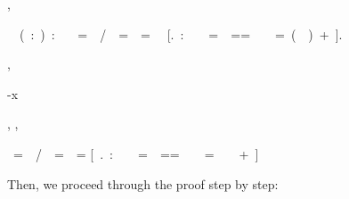 \documentclass[a4paper]{article}
\begin{document}
\begin{alectryon}
  \sep
  \begin{sentence}
    \begin{input}
      ~~(~:~)~:\nl
      ~~~=~~\PYZbs{}/~~=~~=\PYZgt{}\nl
      ~~[.~:~~\PYZpc{}\PYZpc{}~~=~~==\PYZgt{}~~\PYZpc{}\PYZpc{}~~=~(~\PYZpc{}\PYZpc{}~)~+~].
    \end{input}
    \sep
    \begin{output}
      \begin{goals}
        \begin{goal}
          \begin{hyps}
            \hyp{x}{}
          \end{hyps}
          \sep
          \infrule{}
          \sep
          \begin{conclusion}
            ~=~~\PYZbs{}/~~=~~=\PYZgt{}\nl
            [~.~:~~\PYZpc{}\PYZpc{}~~=~~==\PYZgt{}~~\PYZpc{}\PYZpc{}~~=~~\PYZpc{}\PYZpc{}~~+~]
          \end{conclusion}
        \end{goal}
      \end{goals}
    \end{output}
  \end{sentence}
\end{alectryon}

Then, we proceed through the proof step by step:
\end{document}
